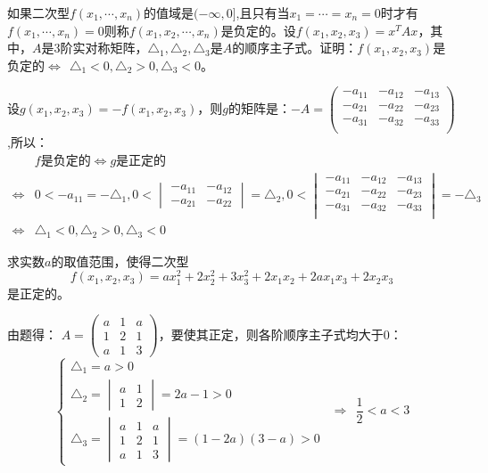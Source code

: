\documentclass[a4paper]{report}
\begin{document}
\EX 如果二次型$f(x_1,\cdots,x_n)$的值域是$(-\infty,0]$,且只有当$x_1=\cdots=x_n=0$时才有$f(x_1,\cdots,x_n)=0$则称$f(x_1,x_2,\cdots,x_n)$是负定的。设$f(x_1,x_2,x_3)=x^TAx$，其中，$A$是3阶实对称矩阵，$\triangle_1,\triangle_2,\triangle_3$是$A$的顺序主子式。证明：$f(x_1,x_2,x_3)$是负定的$\Leftrightarrow~~\triangle_1<0,\triangle_2>0,\triangle_3<0$。

\begin{zhengming}
设$g(x_1,x_2,x_3)=-f(x_1,x_2,x_3)$，则$g$的矩阵是：$
-A=
\begin{pmatrix}
-a_{11}&-a_{12}&-a_{13}\\
-a_{21}&-a_{22}&-a_{23}\\
-a_{31}&-a_{32}&-a_{33}\\
\end{pmatrix}
$,所以：
\begin{align*}
&f\text{是负定的}\Leftrightarrow g\text{是正定的}\\
\Leftrightarrow&0<-a_{11}=-\triangle_1,0<
\begin{vmatrix}
-a_{11}&-a_{12}\\
-a_{21}&-a_{22}
\end{vmatrix}=\triangle_2,0<\begin{vmatrix}
-a_{11}&-a_{12}&-a_{13}\\
-a_{21}&-a_{22}&-a_{23}\\
-a_{31}&-a_{32}&-a_{33}\\
\end{vmatrix}=-\triangle_3\\
\Leftrightarrow&\triangle_1<0,\triangle_2>0,\triangle_3<0
\end{align*}
\end{zhengming}

\EX 求实数$a$的取值范围，使得二次型
\begin{equation*}
f(x_1,x_2,x_3)=ax_1^2+2x_2^2+3x_3^2+2x_1x_2+2ax_1x_3+2x_2x_3
\end{equation*}是正定的。

\begin{jie}
由题得：
$
A=
\begin{pmatrix}
a&1&a\\
1&2&1\\
a&1&3
\end{pmatrix}
$，要使其正定，则各阶顺序主子式均大于0：
\begin{equation*}
\begin{cases}
\triangle_1=a>0\\
\triangle_2=\begin{vmatrix}
              a&1\\
1&2
            \end{vmatrix}=2a-1>0\\
\triangle_3=
\begin{vmatrix}
a&1&a\\
1&2&1\\
a&1&3
\end{vmatrix}=(1-2a)(3-a)>0
\end{cases}~~\Rightarrow~~
\frac{1}{2}<a<3
\end{equation*}
\end{jie}
\end{document}
